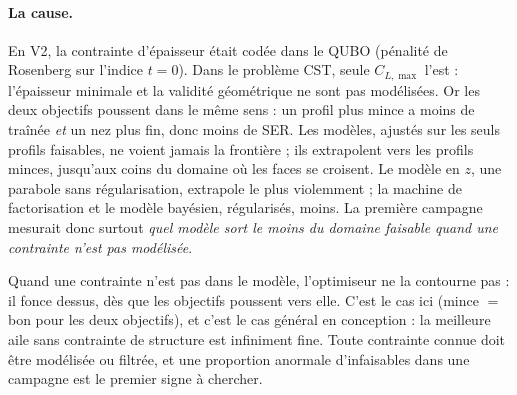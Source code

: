 \paragraph{La cause.} En V2, la contrainte d'épaisseur était codée dans le QUBO (pénalité de Rosenberg sur l'indice $t=0$). Dans le problème CST, seule $C_{L,\max}$ l'est : l'épaisseur minimale et la validité géométrique ne sont pas modélisées. Or les deux objectifs poussent dans le même sens : un profil plus mince a moins de traînée \emph{et} un nez plus fin, donc moins de SER. Les modèles, ajustés sur les seuls profils faisables, ne voient jamais la frontière ; ils extrapolent vers les profils minces, jusqu'aux coins du domaine où les faces se croisent. Le modèle en $z$, une parabole sans régularisation, extrapole le plus violemment ; la machine de factorisation et le modèle bayésien, régularisés, moins. La première campagne mesurait donc surtout \emph{quel modèle sort le moins du domaine faisable quand une contrainte n'est pas modélisée}.

\begin{piege}
Quand une contrainte n'est pas dans le modèle, l'optimiseur ne la contourne pas : il fonce dessus, dès que les objectifs poussent vers elle. C'est le cas ici (mince $=$ bon pour les deux objectifs), et c'est le cas général en conception : la meilleure aile sans contrainte de structure est infiniment fine. Toute contrainte connue doit être modélisée ou filtrée, et une proportion anormale d'infaisables dans une campagne est le premier signe à chercher.
\end{piege}

